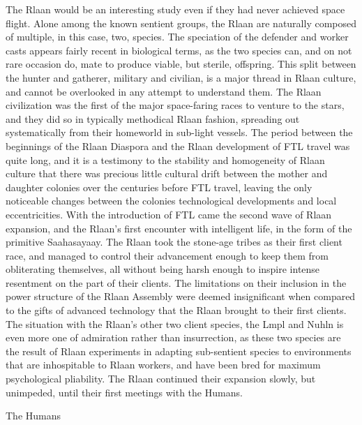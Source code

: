 The Rlaan would be an interesting study even if they had never achieved space flight. Alone among the known sentient groups, the Rlaan are naturally composed of multiple, in this case, two, species. The speciation of the defender and worker casts appears fairly recent in biological terms, as the two species can, and on not rare occasion do, mate to produce viable, but sterile, offspring. This split between the hunter and gatherer, military and civilian, is a major thread in Rlaan culture, and cannot be overlooked in any attempt to understand them. The Rlaan civilization was the first of the major space-faring races to venture to the stars, and they did so in typically methodical Rlaan fashion, spreading out systematically from their homeworld in sub-light vessels. The period between the beginnings of the Rlaan Diaspora and the Rlaan development of FTL travel was quite long, and it is a testimony to the stability and homogeneity of Rlaan culture that there was precious little cultural drift between the mother and daughter colonies over the centuries before FTL travel, leaving the only noticeable changes between the colonies technological developments and local eccentricities. With the introduction of FTL came the second wave of Rlaan expansion, and the Rlaan’s first encounter with intelligent life, in the form of the primitive Saahasayaay. The Rlaan took the stone-age tribes as their first client race, and managed to control their advancement enough to keep them from obliterating themselves, all without being harsh enough to inspire intense resentment on the part of their clients. The limitations on their inclusion in the power structure of the Rlaan Assembly were deemed insignificant when compared to the gifts of advanced technology that the Rlaan brought to their first clients. The situation with the Rlaan’s other two client species, the Lmpl and Nuhln is even more one of admiration rather than insurrection, as these two species are the result of Rlaan experiments in adapting sub-sentient species to environments that are inhospitable to Rlaan workers, and have been bred for maximum psychological pliability. The Rlaan continued their expansion slowly, but unimpeded, until their first meetings with the Humans.

The Humans

